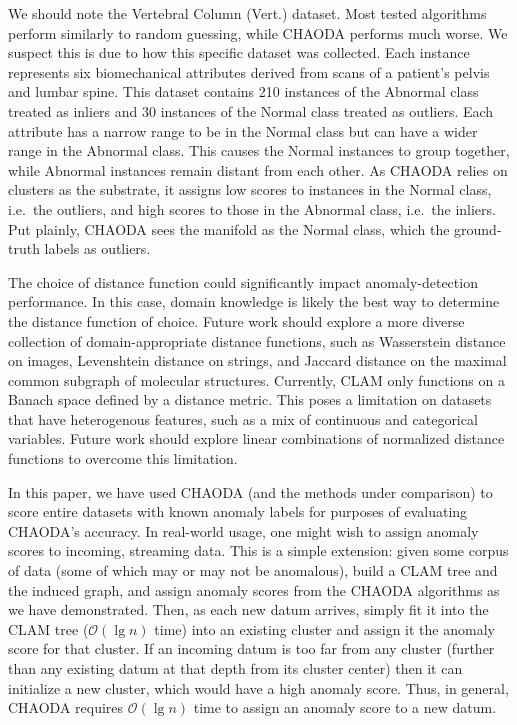 We should note the Vertebral Column (Vert.) dataset.
Most tested algorithms perform similarly to random guessing, while CHAODA performs much worse.
We suspect this is due to how this specific dataset was collected.
Each instance represents six biomechanical attributes derived from scans of a patient's pelvis and lumbar spine.
This dataset contains 210 instances of the Abnormal class treated as inliers and 30 instances of the Normal class treated as outliers.
Each attribute has a narrow range to be in the Normal class but can have a wider range in the Abnormal class.
This causes the Normal instances to group together, while Abnormal instances remain distant from each other.
As CHAODA relies on clusters as the substrate, it assigns low scores to instances in the Normal class, i.e.\ the outliers, and high scores to those in the Abnormal class, i.e.\ the inliers.
Put plainly, CHAODA sees the manifold as the Normal class, which the ground-truth labels as outliers.

The choice of distance function could significantly impact anomaly-detection performance.
In this case, domain knowledge is likely the best way to determine the distance function of choice.
Future work should explore a more diverse collection of domain-appropriate distance functions, such as Wasserstein distance on images, Levenshtein distance on strings, and Jaccard distance on the maximal common subgraph of molecular structures.
Currently, CLAM only functions on a Banach space defined by a distance metric.
This poses a limitation on datasets that have heterogenous features, such as a mix of continuous and categorical variables.
Future work should explore linear combinations of normalized distance functions to overcome this limitation.

In this paper, we have used CHAODA (and the methods under comparison) to score entire datasets with known anomaly labels for purposes of evaluating CHAODA's accuracy.
In real-world usage, one might wish to assign anomaly scores to incoming, streaming data.
This is a simple extension: given some corpus of data (some of which may or may not be anomalous), build a CLAM tree and the induced graph, and assign anomaly scores from the CHAODA algorithms as we have demonstrated.
Then, as each new datum arrives, simply fit it into the CLAM tree ($\mathcal{O}(\lg n)$ time) into an existing cluster and assign it the anomaly score for that cluster.
If an incoming datum is too far from any cluster (further than any existing datum at that depth from its cluster center) then it can initialize a new cluster, which would have a high anomaly score.
Thus, in general, CHAODA requires $\mathcal{O}(\lg n)$ time to assign an anomaly score to a new datum.

